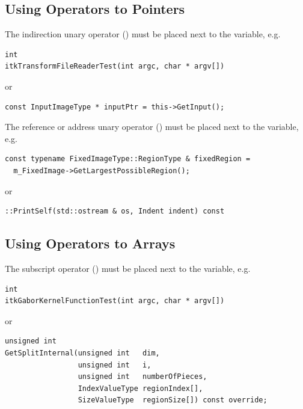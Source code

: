 \subsection{Using Operators to Pointers}%
\label{subsec:UsingOperatorsToPointers}

The indirection unary operator (\code{*}) must be placed next to the variable, e.g.

\small
\begin{verbatim}
int
itkTransformFileReaderTest(int argc, char * argv[])
\end{verbatim}
\normalsize

or

\small
\begin{verbatim}
const InputImageType * inputPtr = this->GetInput();
\end{verbatim}
\normalsize

The reference or address unary operator (\code{\&}) must be placed next to the
variable, e.g.

\small
\begin{verbatim}
const typename FixedImageType::RegionType & fixedRegion =
  m_FixedImage->GetLargestPossibleRegion();
\end{verbatim}
\normalsize

or

\small
\begin{verbatim}
::PrintSelf(std::ostream & os, Indent indent) const
\end{verbatim}
\normalsize


\subsection{Using Operators to Arrays}%
\label{subsec:UsingOperatorsToArrays}

The subscript operator (\code{[]}) must be placed next to the variable, e.g.
\small
\begin{verbatim}
int
itkGaborKernelFunctionTest(int argc, char * argv[])
\end{verbatim}
\normalsize

or

\small
\begin{verbatim}
unsigned int
GetSplitInternal(unsigned int   dim,
                 unsigned int   i,
                 unsigned int   numberOfPieces,
                 IndexValueType regionIndex[],
                 SizeValueType  regionSize[]) const override;
\end{verbatim}
\normalsize


